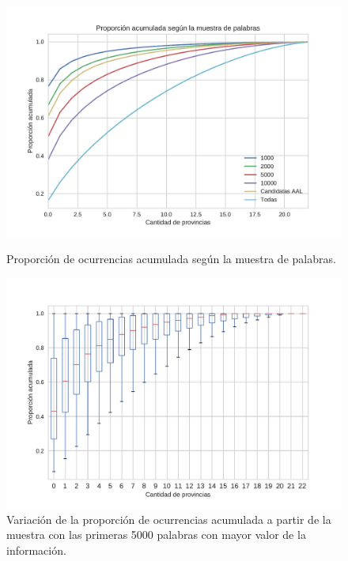 \begin{figure}[!ht]\centering
  \begin{minipage}{0.49\textwidth}
    \includegraphics[width=\linewidth]{./images/PropAcum.pdf}
    \caption{Proporción de ocurrencias acumulada según la muestra de palabras.} 
    \label{fig:propAcum} 
   \end{minipage}
   \begin{minipage}{0.49\textwidth}
    \includegraphics[width=\linewidth]{./images/PropAcum5000.pdf}
    \caption{Variación de la proporción de ocurrencias acumulada a partir de la muestra con las primeras 5000 palabras con mayor valor de la información.} 
    \label{fig:propAcum5000} 
   \end{minipage}
   
\end{figure}

